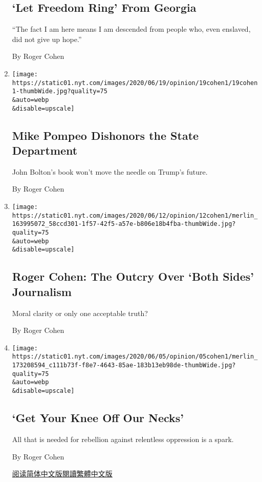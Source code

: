 \begin{enumerate}
  \hypertarget{let-freedom-ring-from-georgia}{%
  \subsection{`Let Freedom Ring' From
  Georgia}\label{let-freedom-ring-from-georgia}}

  ``The fact I am here means I am descended from people who, even
  enslaved, did not give up hope.''

  By Roger Cohen
\item
  \href{/2020/06/19/opinion/mike-pompeo-state-department.html}{}

  \texttt{[image: https://static01.nyt.com/images/2020/06/19/opinion/19cohen1/19cohen1-thumbWide.jpg?quality=75\\\&auto=webp\\\&disable=upscale]}

  \hypertarget{mike-pompeo-dishonors-the-state-department}{%
  \subsection{Mike Pompeo Dishonors the State
  Department}\label{mike-pompeo-dishonors-the-state-department}}

  John Bolton's book won't move the needle on Trump's future.

  By Roger Cohen
\item
  \href{/2020/06/12/opinion/journalism-debate.html}{}

  \texttt{[image: https://static01.nyt.com/images/2020/06/12/opinion/12cohen1/merlin\_163995072\_58ccd301-1f57-42f5-a57e-b806e18b4fba-thumbWide.jpg?quality=75\\\&auto=webp\\\&disable=upscale]}

  \hypertarget{roger-cohen-the-outcry-over-both-sides-journalism}{%
  \subsection{Roger Cohen: The Outcry Over `Both Sides'
  Journalism}\label{roger-cohen-the-outcry-over-both-sides-journalism}}

  Moral clarity or only one acceptable truth?

  By Roger Cohen
\item
  \href{/2020/06/05/opinion/george-floyd-protests.html}{}

  \texttt{[image: https://static01.nyt.com/images/2020/06/05/opinion/05cohen1/merlin\_173208594\_c111b73f-f8e7-4643-85ae-183b13eb98de-thumbWide.jpg?quality=75\\\&auto=webp\\\&disable=upscale]}

  \hypertarget{get-your-knee-off-our-necks}{%
  \subsection{`Get Your Knee Off Our
  Necks'}\label{get-your-knee-off-our-necks}}

  All that is needed for rebellion against relentless oppression is a
  spark.

  By Roger Cohen

  \href{https://cn.nytimes.com/opinion/20200610/george-floyd-protests/}{阅读简体中文版}\href{https://cn.nytimes.com/opinion/20200610/george-floyd-protests/zh-hant/}{閱讀繁體中文版}
\end{enumerate}

